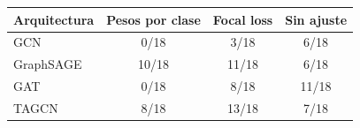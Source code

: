 \begin{tabular}{lccc}
\toprule
Arquitectura & Pesos por clase & Focal loss & Sin ajuste \\
\midrule
GCN & 0/18 & 3/18 & 6/18 \\
GraphSAGE & 10/18 & 11/18 & 6/18 \\
GAT & 0/18 & 8/18 & 11/18 \\
TAGCN & 8/18 & 13/18 & 7/18 \\
\bottomrule
\end{tabular}
